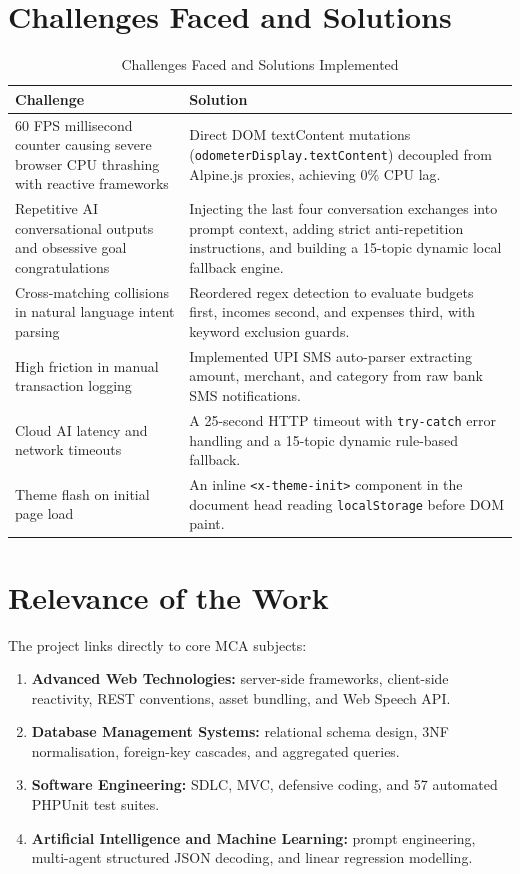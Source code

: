 \documentclass[12pt,a4paper]{report}
\begin{document}
\section{Challenges Faced and Solutions}\label{s53}

\begin{table}[H]
\centering
\caption{Challenges Faced and Solutions Implemented}
\renewcommand{\arraystretch}{1.3}
\begin{tabular}{|p{6.0cm}|p{8.0cm}|}
\hline
\textbf{Challenge} & \textbf{Solution} \\ \hline
60 FPS millisecond counter causing severe browser CPU thrashing with reactive frameworks
&
Direct DOM textContent mutations (\texttt{odometerDisplay.textContent}) decoupled from Alpine.js proxies, achieving 0\% CPU lag.
\\ \hline
Repetitive AI conversational outputs and obsessive goal congratulations
&
Injecting the last four conversation exchanges into prompt context, adding strict anti-repetition instructions, and building a 15-topic dynamic local fallback engine.
\\ \hline
Cross-matching collisions in natural language intent parsing
&
Reordered regex detection to evaluate budgets first, incomes second, and expenses third, with keyword exclusion guards.
\\ \hline
High friction in manual transaction logging
&
Implemented UPI SMS auto-parser extracting amount, merchant, and category from raw bank SMS notifications.
\\ \hline
Cloud AI latency and network timeouts
&
A 25-second HTTP timeout with \texttt{try-catch} error handling and a 15-topic dynamic rule-based fallback.
\\ \hline
Theme flash on initial page load
&
An inline \texttt{<x-theme-init>} component in the document head reading \texttt{localStorage} before DOM paint.
\\ \hline
\end{tabular}
\end{table}


\section{Relevance of the Work}\label{s54}

The project links directly to core MCA subjects:
\begin{enumerate}[leftmargin=*]
    \item \textbf{Advanced Web Technologies:} server-side frameworks, client-side reactivity, REST conventions, asset bundling, and Web Speech API.
    \item \textbf{Database Management Systems:} relational schema design, 3NF normalisation, foreign-key cascades, and aggregated queries.
    \item \textbf{Software Engineering:} SDLC, MVC, defensive coding, and 57 automated PHPUnit test suites.
    \item \textbf{Artificial Intelligence and Machine Learning:} prompt engineering, multi-agent structured JSON decoding, and linear regression modelling.
\end{enumerate}
\end{document}
